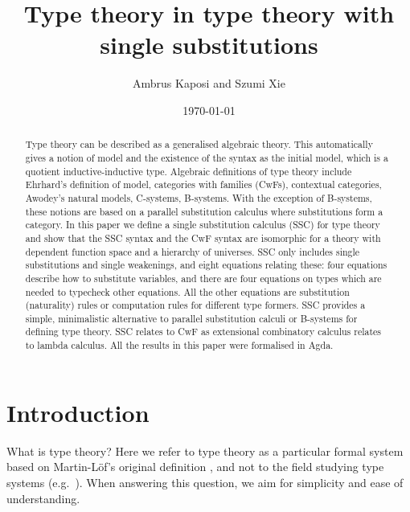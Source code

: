 \documentclass[sigplan,10pt,anonymous,review]{acmart}\settopmatter{printfolios=true,printccs=false,printacmref=false}
\begin{document}
\title{Type theory in type theory with single substitutions}
\author{Ambrus Kaposi and Szumi Xie}
\date{\today}

\begin{abstract}
Type theory can be described as a generalised algebraic theory. This
automatically gives a notion of model and the existence of the syntax
as the initial model, which is a quotient inductive-inductive
type. Algebraic definitions of type theory include Ehrhard's
definition of model, categories with families (CwFs), contextual
categories, Awodey's natural models, C-systems, B-systems. With the
exception of B-systems, these notions are based on a parallel
substitution calculus where substitutions form a category. In this
paper we define a single substitution calculus (SSC) for type theory
and show that the SSC syntax and the CwF syntax are isomorphic for a
theory with dependent function space and a hierarchy of universes. SSC
only includes single substitutions and single weakenings, and eight
equations relating these: four equations describe how to substitute
variables, and there are four equations on types which are needed to
typecheck other equations. All the other equations are substitution
(naturality) rules or computation rules for different type
formers. SSC provides a simple, minimalistic alternative to parallel
substitution calculi or B-systems for defining type theory. SSC
relates to CwF as extensional combinatory calculus relates to lambda
calculus. All the results in this paper were formalised in Agda.
\end{abstract}

\maketitle

\section{Introduction}

What is type theory? Here we refer to type theory as a particular
formal system based on Martin-Löf's original definition
\cite{martinlof73predicative}, and not to the field studying type
systems (e.g.\ \cite{DBLP:books/daglib/0005958}). When answering this
question, we aim for simplicity and ease of understanding.
\end{document}
